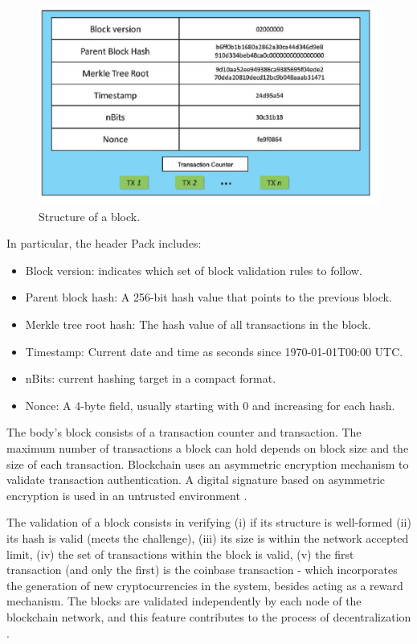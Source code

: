 \begin{figure}[htbp]
\begin{center}
  \includegraphics[scale=0.5]{images/blockStructure.png}
\caption{Structure of a block. \cite{zheng2016blockchain}}
\label{fig:block}
\end{center}
\end{figure}

In particular, the header Pack includes:

\begin{itemize}
\item Block version: indicates which set of block validation rules to follow.
\item Parent block hash: A 256-bit hash value that points to the previous block.
\item Merkle tree root hash: The hash value of all transactions in the block.
\item Timestamp: Current date and time as seconds since 1970-01-01T00:00 UTC.
\item  nBits: current hashing target in a compact format.
\item Nonce: A 4-byte field, usually starting with 0 and increasing for each hash.
\end{itemize}

The body's block consists of a transaction counter and transaction. The maximum number of transactions a block can hold depends on block size and the size of each transaction. Blockchain uses an asymmetric encryption mechanism to validate transaction authentication. A digital signature based on asymmetric encryption is used in an untrusted environment \cite{zheng2016blockchain}.

The validation of a block consists in verifying (i) if its structure is well-formed (ii) its hash is valid (meets the challenge), (iii) its size is within the network accepted limit, (iv) the set of transactions within the block is valid, (v) the first transaction (and only the first) is the coinbase transaction - which incorporates the generation of new cryptocurrencies in the system, besides acting as a reward mechanism. The blocks are validated independently by each node of the blockchain network, and this feature contributes to the process of decentralization \cite{greve2018blockchain}.

